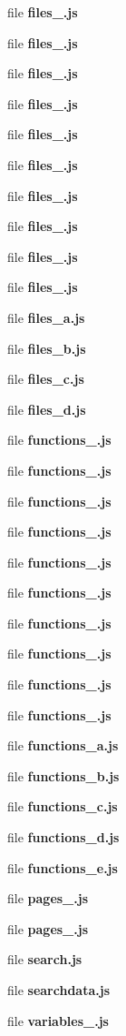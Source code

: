 \begin{DoxyCompactItemize}
file {\bf files\+\_.\+js}
\item 
file {\bf files\+\_.\+js}
\item 
file {\bf files\+\_.\+js}
\item 
file {\bf files\+\_.\+js}
\item 
file {\bf files\+\_.\+js}
\item 
file {\bf files\+\_.\+js}
\item 
file {\bf files\+\_.\+js}
\item 
file {\bf files\+\_.\+js}
\item 
file {\bf files\+\_.\+js}
\item 
file {\bf files\+\_.\+js}
\item 
file {\bf files\+\_\+a.\+js}
\item 
file {\bf files\+\_\+b.\+js}
\item 
file {\bf files\+\_\+c.\+js}
\item 
file {\bf files\+\_\+d.\+js}
\item 
file {\bf functions\+\_.\+js}
\item 
file {\bf functions\+\_.\+js}
\item 
file {\bf functions\+\_.\+js}
\item 
file {\bf functions\+\_.\+js}
\item 
file {\bf functions\+\_.\+js}
\item 
file {\bf functions\+\_.\+js}
\item 
file {\bf functions\+\_.\+js}
\item 
file {\bf functions\+\_.\+js}
\item 
file {\bf functions\+\_.\+js}
\item 
file {\bf functions\+\_.\+js}
\item 
file {\bf functions\+\_\+a.\+js}
\item 
file {\bf functions\+\_\+b.\+js}
\item 
file {\bf functions\+\_\+c.\+js}
\item 
file {\bf functions\+\_\+d.\+js}
\item 
file {\bf functions\+\_\+e.\+js}
\item 
file {\bf pages\+\_.\+js}
\item 
file {\bf pages\+\_.\+js}
\item 
file {\bf search.\+js}
\item 
file {\bf searchdata.\+js}
\item 
file {\bf variables\+\_.\+js}
\item 

\end{DoxyCompactItemize}
